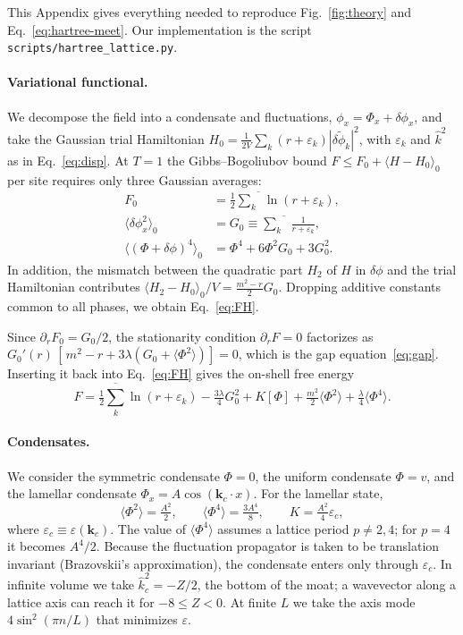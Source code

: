 \documentclass[aps,prd,twocolumn,superscriptaddress,nofootinbib,10pt]{revtex4-2}
\newcommand{\khat}{\widehat{k}^{2}}
\begin{document}
This Appendix gives everything needed to reproduce Fig.~\ref{fig:theory}
and Eq.~\eqref{eq:hartree-meet}.  Our implementation is the script
\texttt{scripts/hartree\_lattice.py}.

\paragraph*{Variational functional.}
We decompose the field into a condensate and fluctuations,
$\phi_x=\Phi_x+\delta\phi_x$, and take the Gaussian trial Hamiltonian
$H_0=\frac{1}{2V}\sum_k(r+\varepsilon_k)|\delta\tilde\phi_k|^2$, with
$\varepsilon_k$ and $\khat$ as in Eq.~\eqref{eq:disp}.  At $T=1$ the
Gibbs--Bogoliubov bound $F\le F_0+\langle H-H_0\rangle_0$ per site requires
only three Gaussian averages:
\begin{align*}
 F_0&=\tfrac12\overline{\textstyle\sum_k}\ln(r+\varepsilon_k),\\
 \langle\delta\phi_x^2\rangle_0&=G_0\equiv\overline{\textstyle\sum_k}\,\frac{1}{r+\varepsilon_k},\\
 \langle(\Phi+\delta\phi)^4\rangle_0&=\Phi^4+6\Phi^2G_0+3G_0^2.
\end{align*}
In addition, the mismatch between the quadratic part $H_2$ of $H$ in
$\delta\phi$ and the trial Hamiltonian contributes
$\langle H_2-H_0\rangle_0/V=\frac{m^2-r}{2}G_0$.  Dropping additive constants
common to all phases, we obtain Eq.~\eqref{eq:FH}.

Since $\partial_rF_0=G_0/2$, the stationarity condition $\partial_rF=0$
factorizes as
$G_0'(r)\,[\,m^2-r+3\lambda(G_0+\langle\Phi^2\rangle)]=0$, which is the gap
equation~\eqref{eq:gap}.  Inserting it back into Eq.~\eqref{eq:FH} gives the
on-shell free energy
\begin{equation}
 F=\tfrac12\overline{\textstyle\sum_k}\ln(r+\varepsilon_k)-\tfrac{3\lambda}{4}G_0^2
 +K[\Phi]+\tfrac{m^2}{2}\langle\Phi^2\rangle+\tfrac{\lambda}{4}\langle\Phi^4\rangle .
 \label{eq:FH-onshell}
\end{equation}

\paragraph*{Condensates.}
We consider the symmetric condensate $\Phi=0$, the uniform condensate
$\Phi=v$, and the lamellar condensate $\Phi_x=A\cos(\mathbf k_c\cdot x)$.  For
the lamellar state,
\[
 \langle\Phi^2\rangle=\tfrac{A^2}{2},\qquad
 \langle\Phi^4\rangle=\tfrac{3A^4}{8},\qquad
 K=\tfrac{A^2}{4}\varepsilon_c ,
\]
where $\varepsilon_c\equiv\varepsilon(\mathbf k_c)$.  The value of
$\langle\Phi^4\rangle$ assumes a lattice period $p\ne2,4$; for $p=4$ it
becomes $A^4/2$.  Because the fluctuation propagator is taken to be
translation invariant (Brazovskii's approximation), the condensate enters
only through $\varepsilon_c$.  In infinite volume we take $\khat_c=-Z/2$, the
bottom of the moat; a wavevector along a lattice axis can reach it for
$-8\le Z<0$.  At finite $L$ we take the axis mode $4\sin^2(\pi n/L)$ that
minimizes $\varepsilon$.
\end{document}
